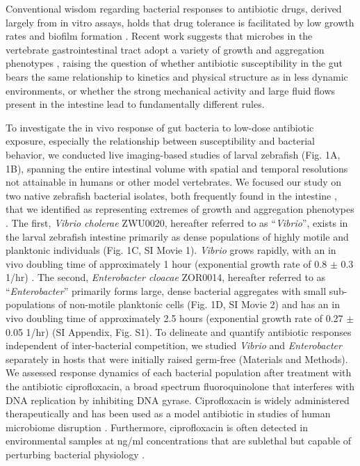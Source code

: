 Conventional wisdom regarding bacterial responses to antibiotic drugs, derived largely from in vitro assays, holds that drug tolerance is facilitated by low growth rates and biofilm formation \cite{walters2003contributions,fux2005survival}. Recent work suggests that microbes in the vertebrate gastrointestinal tract adopt a variety of growth and aggregation phenotypes \cite{korem2015growth,schlomann2018bacterial,Moor2017,welch2017spatial}, raising the question of whether antibiotic susceptibility in the gut bears the same relationship to kinetics and physical structure as in less dynamic environments, or whether the strong mechanical activity and large fluid flows present in the intestine \cite{cremer2017effect} lead to fundamentally different rules.

To investigate the in vivo response of gut bacteria to low-dose antibiotic exposure, especially the relationship between susceptibility and bacterial behavior, we conducted live imaging-based studies of larval zebrafish (Fig. 1A, 1B), spanning the entire intestinal volume with spatial and temporal resolutions not attainable in humans or other model vertebrates. We focused our study on two native zebrafish bacterial isolates, both frequently found in the intestine \cite{Stephens2016}, that we identified as representing extremes of growth and aggregation phenotypes \cite{schlomann2018bacterial}. The first, \textit{Vibrio cholerae} ZWU0020, hereafter referred to as ``\textit{Vibrio}'', exists in the larval zebrafish intestine primarily as dense populations of highly motile and planktonic individuals (Fig. 1C, SI Movie 1).  \textit{Vibrio} grows rapidly, with an in vivo doubling time of approximately 1 hour (exponential growth rate of 0.8 $\pm$ 0.3 1/hr) \cite{Wiles2016}. The second,  \textit{Enterobacter cloacae} ZOR0014, hereafter referred to as ``\textit{Enterobacter}'' primarily forms large, dense bacterial aggregates with small sub-populations of non-motile planktonic cells (Fig. 1D, SI Movie 2) \cite{Wiles2018} and has an in vivo doubling time of approximately 2.5 hours (exponential growth rate of 0.27 $\pm$ 0.05 1/hr) (SI Appendix, Fig. S1). To delineate and quantify antibiotic responses independent of inter-bacterial competition, we studied \textit{Vibrio} and \textit{Enterobacter} separately in hosts that were initially raised germ-free (Materials and Methods). We assessed response dynamics of each bacterial population after treatment with the antibiotic ciprofloxacin, a broad spectrum fluoroquinolone that interferes with DNA replication by inhibiting DNA gyrase. Ciprofloxacin is widely administered therapeutically and has been used as a model antibiotic in studies of human microbiome disruption  \cite{relmanABX_2011}. Furthermore, ciprofloxacin is often detected in environmental samples at ng/ml concentrations that are sublethal but capable of perturbing bacterial physiology \cite{girardi2011biodegradation, goneau2015subinhibitory}. 


